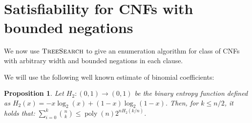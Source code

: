\documentclass[10pt,a4paper]{article}
\newtheorem{proposition}{Proposition}
\newcommand{\poly}{\operatorname{poly}}
\newcommand{\ts}{\textsc{TreeSearch}}
\begin{document}
























\section{Satisfiability for CNFs with bounded negations} \label{sec:satboundedneg}

We now use $\ts$ to give an enumeration algorithm for class of CNFs with arbitrary width and bounded negations in each clause.

We will use the following well known estimate of binomial coefficients:
\begin{proposition}
Let $H_2: (0, 1) \rightarrow (0, 1)$ be the binary entropy function defined as $H_2(x) = -x \log_2(x) + (1-x) \log_2(1-x)$. Then, for $k\le n / 2$, it holds that: $\sum_{i = 0}^k\binom{n}{k} \le \poly(n) 2^{n H_2(k / n)}$.
\end{proposition}
\end{document}
